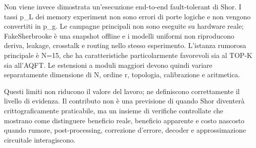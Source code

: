 Non viene invece dimostrata un'esecuzione end-to-end fault-tolerant di Shor. I tassi p\_L dei memory experiment non sono errori di porte logiche e non vengono convertiti in p\_g. Le campagne principali non sono eseguite su hardware reale; FakeSherbrooke è una snapshot offline e i modelli uniformi non riproducono deriva, leakage, crosstalk e routing nello stesso esperimento. L'istanza rumorosa principale è N=15, che ha caratteristiche particolarmente favorevoli sia al TOP-K sia all'AQFT. Le estensioni a moduli maggiori devono quindi variare separatamente dimensione di N, ordine r, topologia, calibrazione e aritmetica.

Questi limiti non riducono il valore del lavoro; ne definiscono correttamente il livello di evidenza. Il contributo non è una previsione di quando Shor diventerà crittograficamente praticabile, ma un insieme di verifiche controllate che mostrano come distinguere beneficio reale, beneficio apparente e costo nascosto quando rumore, post-processing, correzione d'errore, decoder e approssimazione circuitale interagiscono.
